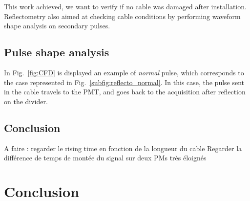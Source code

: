 This work achieved, we want to verify if no cable was damaged after installation.
Reflectometry also aimed at checking cable conditions by performing waveform shape analysis on secondary pulses.

\subsection{Pulse shape analysis}
\label{subsec:pulse_shape}
In Fig.~\ref{fig:CFD} is displayed an example of \emph{normal} pulse, which corresponds to the case represented in Fig.~\ref{subfig:reflecto_normal}.
In this case, the pulse sent in the cable travels to the PMT, and goes back to the acquisition after reflection on the divider.



\subsection{Conclusion}
A faire : regarder le rising time en fonction de la longueur du cable
Regarder la différence de temps de montée du signal sur deux PMs très éloignés




\section{Conclusion}
